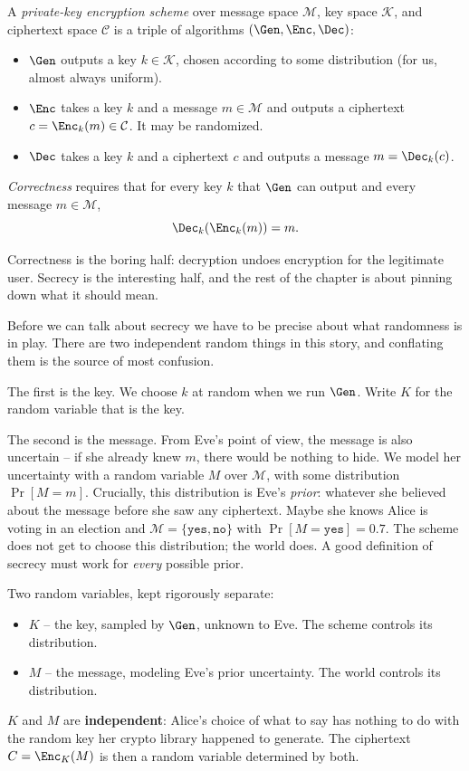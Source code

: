 \begin{definition}
\label{ch09:scheme-def}
A \emph{private-key encryption scheme} over message space $\mathcal{M}$, key space $\mathcal{K}$, and ciphertext space $\mathcal{C}$ is a triple of algorithms $(\Gen, \Enc, \Dec)$:
\begin{itemize}
  \item $\Gen$ outputs a key $k \in \mathcal{K}$, chosen according to some distribution (for us, almost always uniform).
  \item $\Enc$ takes a key $k$ and a message $m \in \mathcal{M}$ and outputs a ciphertext $c = \Enc_k(m) \in \mathcal{C}$. It may be randomized.
  \item $\Dec$ takes a key $k$ and a ciphertext $c$ and outputs a message $m = \Dec_k(c)$.
\end{itemize}
\emph{Correctness} requires that for every key $k$ that $\Gen$ can output and every message $m \in \mathcal{M}$,
\[
  \Dec_k(\Enc_k(m)) = m.
\]
\end{definition}

Correctness is the boring half: decryption undoes encryption for the legitimate user. Secrecy is the interesting half, and the rest of the chapter is about pinning down what it should mean.

Before we can talk about secrecy we have to be precise about what randomness is in play. There are two independent random things in this story, and conflating them is the source of most confusion.

The first is the key. We choose $k$ at random when we run $\Gen$. Write $K$ for the random variable that is the key.

The second is the message. From Eve's point of view, the message is also uncertain -- if she already knew $m$, there would be nothing to hide. We model her uncertainty with a random variable $M$ over $\mathcal{M}$, with some distribution $\Pr[M = m]$. Crucially, this distribution is Eve's \emph{prior}: whatever she believed about the message before she saw any ciphertext. Maybe she knows Alice is voting in an election and $\mathcal{M} = \{\texttt{yes}, \texttt{no}\}$ with $\Pr[M=\texttt{yes}] = 0.7$. The scheme does not get to choose this distribution; the world does. A good definition of secrecy must work for \emph{every} possible prior.

\begin{focusbox}
Two random variables, kept rigorously separate:
\begin{itemize}
  \item $K$ -- the key, sampled by $\Gen$, unknown to Eve. The scheme controls its distribution.
  \item $M$ -- the message, modeling Eve's prior uncertainty. The world controls its distribution.
\end{itemize}
$K$ and $M$ are \textbf{independent}: Alice's choice of what to say has nothing to do with the random key her crypto library happened to generate. The ciphertext $C = \Enc_K(M)$ is then a random variable determined by both.
\end{focusbox}

